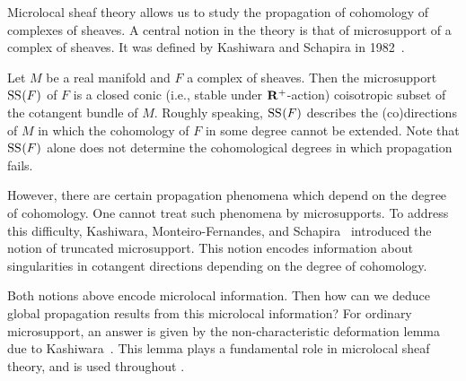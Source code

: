 

Microlocal sheaf theory allows us to
study the propagation of cohomology 
of complexes of sheaves. 
A central notion in the theory 
is that of microsupport of a complex of sheaves. 
It was defined by Kashiwara and Schapira 
in 1982~\cite{KS82}. 

Let \(M\) be a real manifold 
and \(F\) a complex of sheaves. 
Then the microsupport \(\muS[](F)\) of \(F\) is 
a closed conic (i.e., stable 
under \(\rr^{+}\)-action) coisotropic subset 
of the cotangent bundle of \(M\). 
Roughly speaking, \(\muS[](F)\) describes the (co)directions 
of \(M\) in which the cohomology of \(F\) in some degree 
cannot be extended. 
Note that \(\muS[](F)\) alone does not determine
the cohomological degrees 
in which propagation fails.


However, 
there are certain propagation phenomena which depend on 
the degree of cohomology. 
One cannot treat such phenomena by microsupports. 
To address this difficulty, 
Kashiwara, Monteiro-Fernandes, and Schapira~\cite{KMS03a} 
introduced the notion of truncated microsupport. 
This notion encodes information about singularities 
in cotangent directions depending on the degree of cohomology. 

Both notions above encode microlocal information. 
Then how can we deduce 
global propagation results from this microlocal information? 
For ordinary microsupport,
an answer is given by the non-characteristic 
deformation lemma due to Kashiwara~\cite{Kas75}. 
This lemma plays a fundamental role 
in microlocal sheaf theory, and 
is used throughout \cite{KS90}. 

